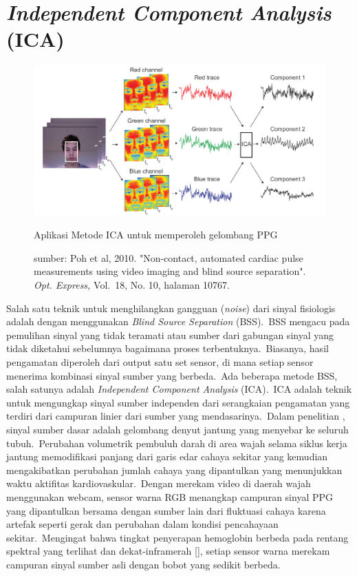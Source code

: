 \section{\textit{Independent Component Analysis} (ICA)}

\begin{figure}[ht]
	\vspace{0.5em}
	\centering
	\includegraphics[width=\textwidth]{ICA}
	\caption{Aplikasi Metode ICA untuk memperoleh gelombang PPG}
	\caption*{sumber: Poh et al, 2010. "Non-contact, automated cardiac pulse measurements using video imaging and blind source separation". \textit{Opt. Express,} Vol.~18, No. 10, halaman 10767.}
	\label{fig:ICA}   
\end{figure}

Salah satu teknik untuk menghilangkan gangguan (\textit{noise}) dari sinyal fisiologis adalah dengan menggunakan \textit{Blind Source Separation} (BSS).~BSS mengacu pada pemulihan sinyal yang tidak teramati atau sumber dari gabungan sinyal yang tidak diketahui sebelumnya bagaimana proses terbentuknya.~Biasanya, hasil pengamatan diperoleh dari output satu set sensor, di mana setiap sensor menerima kombinasi sinyal sumber yang berbeda.~Ada beberapa metode BSS, salah satunya adalah \textit{Independent Component Analysis} (ICA).~ICA adalah teknik untuk mengungkap sinyal sumber independen dari serangkaian pengamatan yang terdiri dari campuran linier dari sumber yang mendasarinya.~Dalam penelitian \citet{Poh2010,Poh2011}, sinyal sumber dasar adalah gelombang denyut jantung yang menyebar ke seluruh tubuh.~Perubahan volumetrik pembuluh darah di area wajah selama siklus kerja jantung memodifikasi panjang dari garis edar cahaya sekitar yang kemudian mengakibatkan perubahan jumlah cahaya yang dipantulkan yang menunjukkan waktu aktifitas kardiovaskular.~Dengan merekam video di daerah wajah menggunakan webcam, sensor warna RGB menangkap campuran sinyal PPG yang dipantulkan bersama dengan sumber lain dari fluktuasi cahaya karena artefak seperti gerak dan perubahan dalam kondisi pencahayaan sekitar.~Mengingat bahwa tingkat penyerapan hemoglobin berbeda pada rentang spektral yang terlihat dan dekat-inframerah [\citet{Zijlstra1991}], setiap sensor warna merekam campuran sinyal sumber asli dengan bobot yang sedikit berbeda.

